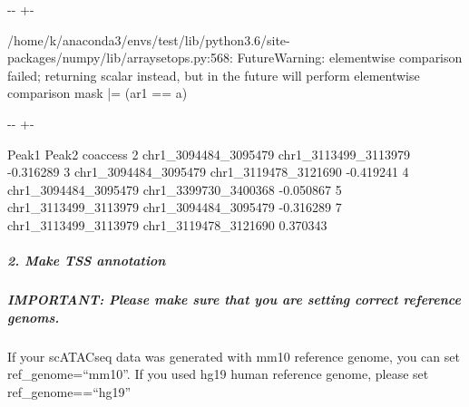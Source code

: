 \documentclass[letterpaper,10pt,english]{sphinxmanual}
\newlength\nbsphinxcodecellspacing
\begin{document}
{

\kern-\sphinxverbatimsmallskipamount\kern-\baselineskip
\kern+\FrameHeightAdjust\kern-\fboxrule
\vspace{\nbsphinxcodecellspacing}

\begin{sphinxVerbatim}[commandchars=\\\{\}]
/home/k/anaconda3/envs/test/lib/python3.6/site-packages/numpy/lib/arraysetops.py:568: FutureWarning: elementwise comparison failed; returning scalar instead, but in the future will perform elementwise comparison
  mask |= (ar1 == a)
\end{sphinxVerbatim}
}

{

\kern-\sphinxverbatimsmallskipamount\kern-\baselineskip
\kern+\FrameHeightAdjust\kern-\fboxrule
\vspace{\nbsphinxcodecellspacing}

\begin{sphinxVerbatim}[commandchars=\\\{\}]
\llap{\color{nbsphinxout}[4]:\,\hspace{\fboxrule}\hspace{\fboxsep}}                  Peak1                 Peak2  coaccess
2  chr1\_3094484\_3095479  chr1\_3113499\_3113979 -0.316289
3  chr1\_3094484\_3095479  chr1\_3119478\_3121690 -0.419241
4  chr1\_3094484\_3095479  chr1\_3399730\_3400368 -0.050867
5  chr1\_3113499\_3113979  chr1\_3094484\_3095479 -0.316289
7  chr1\_3113499\_3113979  chr1\_3119478\_3121690  0.370343
\end{sphinxVerbatim}
}


\subparagraph{2. Make TSS annotation}
\label{\detokenize{notebooks/01_ATAC-seq_data_processing/option1_scATAC-seq_data_analysis_with_cicero/02_preprocess_peak_data:2.-Make-TSS-annotation}}

\subparagraph{IMPORTANT: Please make sure that you are setting correct reference genoms.}
\label{\detokenize{notebooks/01_ATAC-seq_data_processing/option1_scATAC-seq_data_analysis_with_cicero/02_preprocess_peak_data:IMPORTANT:-Please-make-sure-that-you-are-setting-correct-reference-genoms.}}
If your scATAC\sphinxhyphen{}seq data was generated with mm10 reference genome, you can set ref\_genome=“mm10”. If you used hg19 human reference genome, please set ref\_genome==“hg19”
\end{document}
